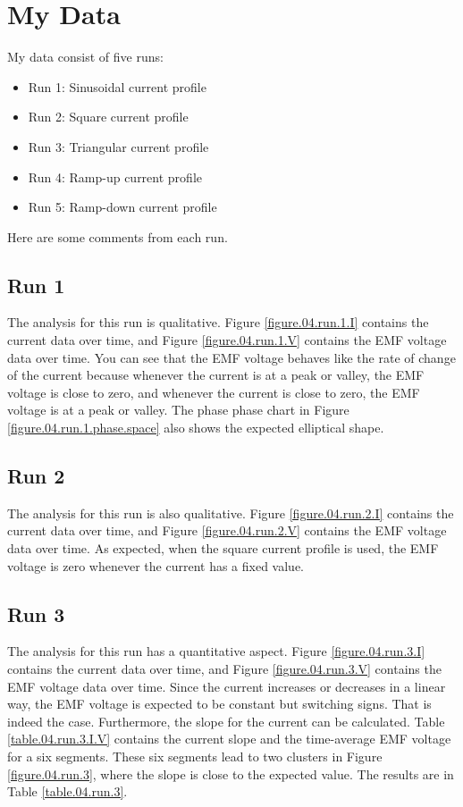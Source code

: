 \section{My Data}
%
My data consist of five runs:
\begin{itemize}
	\item Run 1: Sinusoidal current profile
	\item Run 2: Square current profile
	\item Run 3: Triangular current profile
	\item Run 4: Ramp-up current profile
	\item Run 5: Ramp-down current profile
\end{itemize}
Here are some comments from each run.
%
\subsection{Run 1}
%
The analysis for this run is qualitative. Figure \ref{figure.04.run.1.I} contains the current data over time, and Figure \ref{figure.04.run.1.V} contains the EMF voltage data over time. You can see that the EMF voltage behaves like the rate of change of the current because whenever the current is at a peak or valley, the EMF voltage is close to zero, and whenever the current is close to zero, the EMF voltage is at a peak or valley. The phase phase chart in Figure \ref{figure.04.run.1.phase.space} also shows the expected elliptical shape.
%
\subsection{Run 2}
%
The analysis for this run is also qualitative. Figure \ref{figure.04.run.2.I} contains the current data over time, and Figure \ref{figure.04.run.2.V} contains the EMF voltage data over time. As expected, when the square current profile is used, the EMF voltage is zero whenever the current has a fixed value.
%
\subsection{Run 3}
%
The analysis for this run has a quantitative aspect. Figure \ref{figure.04.run.3.I} contains the current data over time, and Figure \ref{figure.04.run.3.V} contains the EMF voltage data over time. Since the current increases or decreases in a linear way, the EMF voltage is expected to be constant but switching signs. That is indeed the case. Furthermore, the slope for the current can be calculated. Table \ref{table.04.run.3.I.V} contains the current slope and the time-average EMF voltage for a six segments. These six segments lead to two clusters in Figure \ref{figure.04.run.3}, where the slope is close to the expected value. The results are in Table \ref{table.04.run.3}.
%
